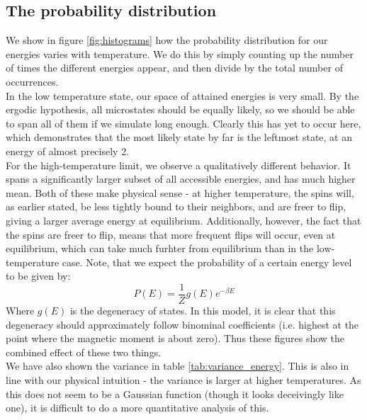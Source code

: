 \documentclass[a4paper, 10pt]{article}
\begin{document}
\subsection{The probability distribution}
We show in figure \ref{fig:histograms} how the probability distribution for our energies varies with temperature. We do this by simply counting up the number of times the different energies appear, and then divide by the total number of occurrences.\\
\linebreak
In the low temperature state, our space of attained energies is very small. By the ergodic hypothesis, all microstates should be equally likely, so we should be able to span all of them if we simulate long enough. Clearly this has yet to occur here, which demonstrates that the most likely state by far is the leftmost state, at an energy of almost precisely 2.\\
\linebreak
For the high-temperature limit, we observe a qualitatively different behavior. It spans a significantly larger subset of all accessible energies, and has  much higher mean. Both of these make physical sense - at higher temperature, the spins will, as earlier stated, be less tightly bound to their neighbors, and are freer to flip, giving a larger average energy at equilibrium. Additionally, however, the fact that the spins are freer to flip, means that more frequent flips will occur, even at equilibrium, which can take much furhter from equilibrium than in the low-temperature case. Note, that we expect the probability of a certain energy level to be given by:
$$P(E)=\frac{1}{Z}g(E)e^{-\beta E}$$
Where $g(E)$ is the degeneracy of states. In this model, it is clear that this degeneracy should approximately follow binominal coefficients (i.e. highest at the point where the magnetic moment is about zero). Thus these figures show the combined effect of these two things.\\
\linebreak
We have also shown the variance in table \ref{tab:variance_energy}. This is also in line with our physical intuition - the variance is larger at higher temperatures. As this does not seem to be a Gaussian function (though it looks deceivingly like one), it is difficult to do a more quantitative analysis of this.
\end{document}
